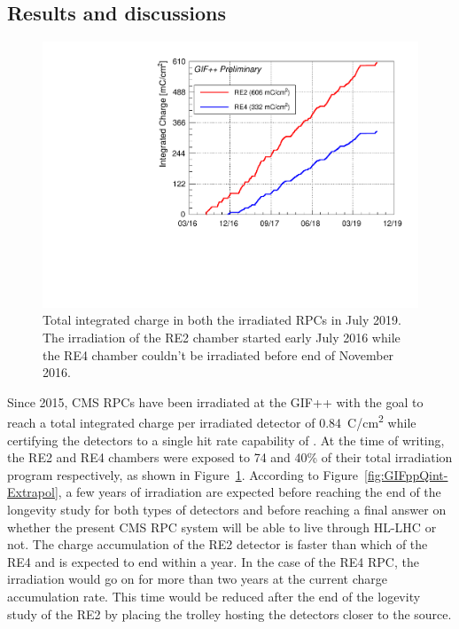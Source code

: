 \newpage
	
	\subsection{Results and discussions}
	\label{chapt5:ssec:resultsGIFpp}
	
\begingroup\setlength{\intextsep}{0pt}\setlength{\columnsep}{15pt}
	
	\begin{figure}
        \centering
		\includegraphics[width = \linewidth]{fig/chapt5/GIFpp-Qint.pdf}
		\caption{\label{fig:GIFppQint} Total integrated charge in both the irradiated RPCs in July 2019. The irradiation of the RE2 chamber started early July 2016 while the RE4 chamber couldn't be irradiated before end of November 2016.}
	\end{figure}
    
    Since 2015, CMS RPCs have been irradiated at the GIF++ with the goal to reach a total integrated charge per irradiated detector of \SI{0.84}{C/cm^2} while certifying the detectors to a single hit rate capability of . At the time of writing, the RE2 and RE4 chambers were exposed to 74 and 40\% of their total irradiation program respectively, as shown in Figure~\ref{fig:GIFppQint}. According to Figure~\ref{fig:GIFppQint-Extrapol}, a few years of irradiation are expected before reaching the end of the longevity study for both types of detectors and before reaching a final answer on whether the present CMS RPC system will be able to live through HL-LHC or not. The charge accumulation of the RE2 detector is faster than which of the RE4 and is expected to end within a year. In the case of the RE4 RPC, the irradiation would go on for more than two years at the current charge accumulation rate. This time would be reduced after the end of the logevity study of the RE2 by placing the trolley hosting the detectors closer to the source.
    

